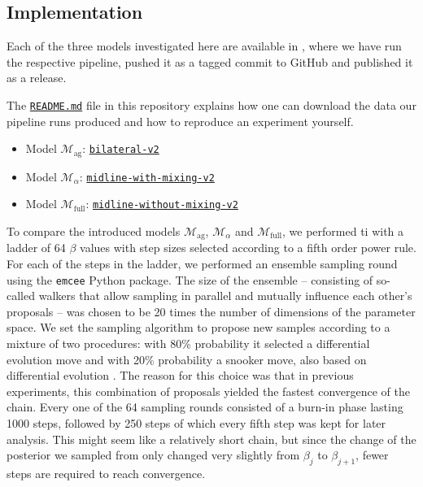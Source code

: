 \documentclass[\relativeRoot/main.tex]{subfiles}
\begin{document}
\subsection{Implementation}
\label{subsec:bilateral:model_comp:implementation}

\begin{tcolorbox}[title=\faIcon{recycle} Reproducibility]
    Each of the three models investigated here are available in , where we have run the respective pipeline, pushed it as a tagged commit to GitHub and published it as a release.

    The \href{https://github.com/rmnldwg/lynference#readme}{ \texttt{README.md}} file in this repository explains how one can download the data our pipeline runs produced and how to reproduce an experiment yourself.

    \begin{itemize}
        \item Model $\mathcal{M}_\text{ag}$: \href{https://github.com/rmnldwg/lynference/releases/tag/bilateral-v2}{ \texttt{bilateral-v2}}
        \item Model $\mathcal{M}_\alpha$: \href{https://github.com/rmnldwg/lynference/releases/tag/midline-with-mixing-v2}{ \texttt{midline-with-mixing-v2}}
        \item Model $\mathcal{M}_\text{full}$: \href{https://github.com/rmnldwg/lynference/releases/tag/midline-without-mixing-v2}{ \texttt{midline-without-mixing-v2}}
    \end{itemize}
\end{tcolorbox}

To compare the introduced models $\mathcal{M}_\text{ag}$, $\mathcal{M}_\alpha$ and $\mathcal{M}_\text{full}$, we performed \gls{ti} with a ladder of 64 $\beta$ values with step sizes selected according to a fifth order power rule. For each of the steps in the ladder, we performed an ensemble sampling round using the \texttt{emcee} \cite{foreman-mackey_emcee_2013} Python package. The size of the ensemble -- consisting of so-called walkers that allow sampling in parallel and mutually influence each other's proposals -- was chosen to be 20 times the number of dimensions of the parameter space. We set the sampling algorithm to propose new samples according to a mixture of two procedures: with 80\% probability it selected a differential evolution move \cite{nelson_run_2013} and with 20\% probability a snooker move, also based on differential evolution \cite{ter_braak_differential_2008}. The reason for this choice was that in previous experiments, this combination of proposals yielded the fastest convergence of the chain. Every one of the 64 sampling rounds consisted of a burn-in phase lasting 1000 steps, followed by 250 steps of which every fifth step was kept for later analysis. This might seem like a relatively short chain, but since the change of the posterior we sampled from only changed very slightly from $\beta_j$ to $\beta_{j+1}$, fewer steps are required to reach convergence.
\end{document}
